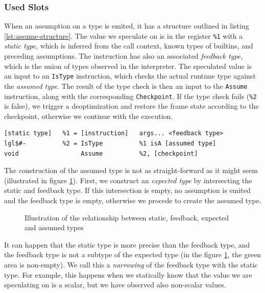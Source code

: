 \subsubsection*{Used Slots}

When an assumption on a type is emited, it has a structure outlined in listing \ref{lst:assume-structure}. The value we speculate on is in the register \texttt{\%1} with a \textit{static type}, which is inferred from the call context, known types of builtins, and preceding assumptions. The instruction has also an associated \textit{feedback type}, which is the union of types observed in the interpreter. The speculated value is an input to an \texttt{IsType} instruction, which checks the actual runtime type against the \textit{assumed type}. The result of the type check is then an input to the \texttt{Assume} instruction, along with the corresponding \texttt{Checkpoint}. If the type check fails (\texttt{\%2} is false), we trigger a deoptimization and restore the frame state according to the checkpoint, otherwise we continue with the execution.

\begin{listing}[H]
	\centering
	\begin{verbatim}
[static type]   %1 = [instruction]   args... <feedback type>
lgl$#-          %2 = IsType          %1 isA [assumed type]
void                 Assume          %2, [checkpoint]
  \end{verbatim}
	\caption{PIR code structure of type assumption}\label{lst:assume-structure}
\end{listing}

The construction of the assumed type is not as straight-forward as it might seem (illustrated in figure \ref{fig:types-venn}). First, we construct an \textit{expected type} by intersecting the static and feedback type. If this intersection is empty, no assumption is emited and the feedback type is empty, otherwise we procede to create the assumed type.

\begin{figure}
	\centering
	\caption{Illustration of the relationship between static, feedback, expected and assumed types}\label{fig:types-venn}
\end{figure}

It can happen that the static type is more precise than the feedback type, and the feedback type is not a subtype of the expected type (in the figure \ref{fig:types-venn}, the green area is non-empty). We call this a \textit{narrowing} of the feedback type with the static type. For example, this happens when we statically know that the value we are speculating on is a scalar, but we have observed also non-scalar values.


